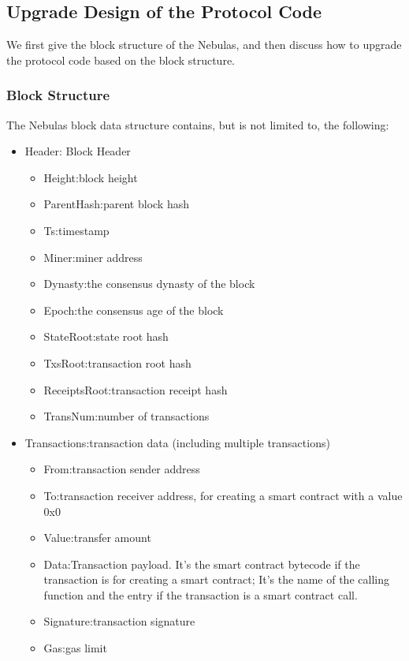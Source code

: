\subsection{Upgrade Design of the Protocol Code}

We first give the block structure of the Nebulas, and then discuss how to upgrade the protocol code based on the block structure.

\subsubsection{Block Structure}

The Nebulas block data structure contains, but is not limited to, the following:

\begin{itemize}
	\item Header: Block Header
		\begin{itemize}
		\item Height:block height
		\item ParentHash:parent block hash
		\item Ts:timestamp
		\item Miner:miner address
		\item Dynasty:the consensus dynasty of the block
		\item Epoch:the consensus age of the block
		\item StateRoot:state root hash
		\item TxsRoot:transaction root hash
		\item ReceiptsRoot:transaction receipt hash
		\item TransNum:number of transactions
		\end{itemize}
	\item Transactions:transaction data (including multiple transactions)
		\begin{itemize}
		\item From:transaction sender address
		\item To:transaction receiver address, for creating a smart contract with a value 0x0
		\item Value:transfer amount
		\item Data:Transaction payload. It's the smart contract bytecode if the transaction is for creating a smart contract; It's the name of the calling function and the entry if the transaction is a smart contract call.
		\item Signature:transaction signature
		\item Gas:gas limit

\end{itemize}
\end{itemize}
